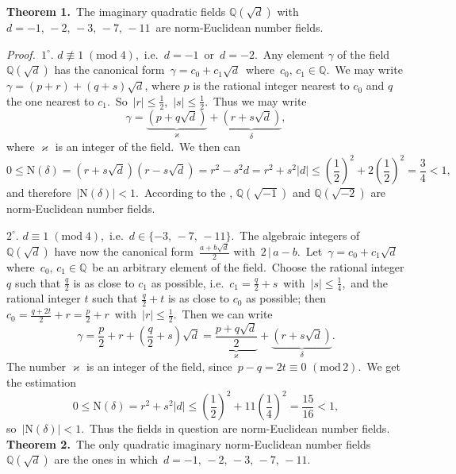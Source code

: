 \documentclass[12pt]{article}
\theoremstyle{definition}
\begin{document}
\textbf{Theorem 1.}\, The imaginary quadratic fields $\mathbb{Q}(\sqrt{d})$ with\, $d = -1,\,-2,\,-3,\,-7,\,-11$\, are norm-Euclidean number fields.

{\em Proof.}\, $1^\circ.$\; $d \not\equiv 1\;(\mbox{mod}\;4)$,\, i.e.\, $d = -1$\, or\, $d = -2$.\, Any element $\gamma$ of the field $\mathbb{Q}(\sqrt{d})$ has the canonical form\, $\gamma = c_0+c_1\sqrt{d}$\, where\, $c_0,\,c_1\in\mathbb{Q}$.\, We may write\, $\gamma = (p+r)+(q+s)\sqrt{d}$, where $p$ is the rational integer nearest to $c_0$ and $q$ the one nearest to $c_1$.\, So\, $|r| \le 
\frac{1}{2}$,\, $|s| \le \frac{1}{2}$.\, Thus we may write
$$\gamma = \underbrace{(p+q\sqrt{d})}_\varkappa+
           \underbrace{(r+s\sqrt{d})}_\delta,$$
where $\varkappa$ is an integer of the field.\, We then can 
$$0 \le \mbox{N}(\delta) = (r+s\sqrt{d})(r-s\sqrt{d}) = r^2-s^2d = 
r^2+s^2|d| \le \left(\frac{1}{2}\right)^2\!+2\left(\frac{1}{2}\right)^2 = \frac{3}{4} < 1,$$
and therefore\, $|\mbox{N}(\delta)| < 1$.\, According to the , $\mathbb{Q}(\sqrt{-1})$ and $\mathbb{Q}(\sqrt{-2})$ are norm-Euclidean number fields.

$2^\circ.$\; $d \equiv 1\;(\mbox{mod}\;4)$,\, i.e.\, $d\in\{-3,\,-7,\,-11\}$.\, The algebraic integers of $\mathbb{Q}(\sqrt{d})$ have now the canonical form\, 
$\frac{a+b\sqrt{d}}{2}$ with\, $2\,|\,a\!-\!b$.\, Let\, $\gamma = c_0+c_1\sqrt{d}$\, where\, $c_0,\,c_1\in\mathbb{Q}$\, be an arbitrary element of the field.\, Choose the rational integer $q$ such that $\frac{q}{2}$ is as close to $c_1$ as possible, i.e.\, $c_1 = \frac{q}{2}+s$\, with\, $|s| \le \frac{1}{4}$,\, and the rational integer $t$ such that $\frac{q}{2}+t$ is as close to $c_0$ as possible; then\, $c_0 = \frac{q+2t}{2}+r = \frac{p}{2}+r$\, with\, $|r| \le \frac{1}{2}$.\, Then we can write
$$\gamma = \frac{p}{2}+r+(\frac{q}{2}+s)\sqrt{d} = 
\underbrace{\frac{p+q\sqrt{d}}{2}}_\varkappa+
\underbrace{(r+s\sqrt{d})}_\delta.$$
The number $\varkappa$ is an integer of the field, since\, $p-q = 2t \equiv 0\,\,(\mbox{mod}\,2)$.\, We get the estimation
$$0 \le \mbox{N}(\delta) = r^2+s^2|d| \le 
\left(\frac{1}{2}\right)^2\!+11\left(\frac{1}{4}\right)^2 = \frac{15}{16} < 1,$$
so\, $|\mbox{N}(\delta)| < 1$.\, Thus the fields in question are norm-Euclidean number fields.\\

\textbf{Theorem 2.}\, The only quadratic imaginary norm-Euclidean number fields  $\mathbb{Q}(\sqrt{d})$ are the ones in which\, $d = -1,\,-2,\,-3,\,-7,\,-11$.
\end{document}
